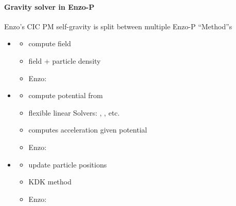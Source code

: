 \begin{frame}[fragile,label=ss-recent-gravity] 
\secframetitle{\ssRecentGravity}
\framesubtitle{Gravity solver in Enzo-P}
   Enzo's CIC PM self-gravity is split between multiple Enzo-P ``Method''s
\begin{itemize}
\item {}
\begin{itemize}
\item        compute  field
\item        {} field +  particle density
\item        Enzo: 
\end{itemize}
\item {}
\begin{itemize}
\item        compute potential from 
\item        flexible linear Solvers: , , etc.
\item        computes acceleration given potential
\item        Enzo: 
\end{itemize}
\item {}
\begin{itemize}
\item        update particle positions
\item        KDK method
\item        Enzo: 
\end{itemize}
\end{itemize}
\end{frame}


